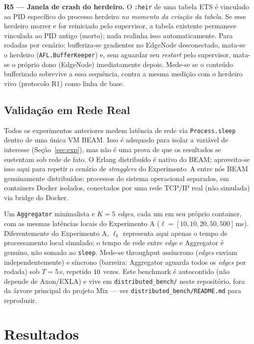 \documentclass[conference,a4paper]{IEEEtran}
\begin{document}
\textbf{R5 --- Janela de crash do herdeiro.} O \texttt{:heir} de uma
tabela ETS é vinculado ao PID específico do processo herdeiro
\emph{no momento da criação da tabela}. Se esse herdeiro morrer e for
reiniciado pelo supervisor, a tabela existente permanece vinculada ao PID
antigo (morto); nada realinha isso automaticamente. Para
\statExpRFiveTrials{} rodadas por cenário: bufferiza-se gradientes no
EdgeNode desconectado, mata-se o herdeiro (\texttt{AFL.BufferKeeper}) e,
sem aguardar seu \emph{restart} pelo supervisor, mata-se o próprio dono
(EdgeNode) imediatamente depois. Mede-se se o conteúdo bufferizado
sobrevive a essa sequência, contra a mesma medição com o herdeiro vivo
(protocolo R1) como linha de base.

\subsection{Validação em Rede Real}
\label{sec:exp_dist}

Todos os experimentos anteriores medem latência de rede via
\texttt{Process.sleep} dentro de uma única VM BEAM. Isso é adequado para
isolar a variável de interesse (Seção~\ref{sec:exp}), mas não é uma prova
de que os resultados se sustentam sob rede de fato. O Erlang distribuído é
nativo do BEAM; aproveita-se isso aqui para repetir o cenário de
\textit{stragglers} do Experimento~A entre nós BEAM genuinamente
distribuídos: processos do sistema operacional separados, em
containers Docker isolados, conectados por uma rede TCP/IP real (não
simulada) via bridge do Docker.

Um \texttt{Aggregator} minimalista e $K=5$ \textit{edges}, cada um em seu
próprio container, com as mesmas latências locais do Experimento A
($\ell = [10,10,20,50,500]$\,ms). Diferentemente do
Experimento A, $\ell_k$ representa aqui apenas o tempo de processamento
local simulado; o tempo de rede entre \textit{edge} e Aggregator é
genuíno, não somado ao \texttt{sleep}. Mede-se throughput
assíncrono (\textit{edges} enviam independentemente) e síncrono (barreira:
Aggregator aguarda todos os \textit{edges} por rodada) sob
$T=5$\,s, repetido $10{}$ vezes. Este benchmark é
autocontido (não depende de Axon/EXLA) e vive em
\texttt{distributed\_bench/} neste repositório, fora da árvore principal
do projeto Mix --- ver \texttt{distributed\_bench/README.md} para
reproduzir.

\section{Resultados}
\label{sec:results}
\end{document}
